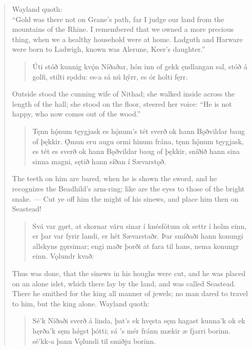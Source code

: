 \begin{verse}
\bvb Wayland quoth: \\
\bvb “Gold was there not on Grane’s path, far I judge our land from the mountains of the Rhine. I remembered that we owned a more precious thing, when we a healthy household were at home. Ladguth and Harware were born to Ladwigh, known was Alerune, Keer’s daughter.”

\begin{verse}
\bva Úti stóð kunnig \hld kvǫ́n Níðaðar,
hón inn of gekk \hld ęndlangan sal,
stóð á golfi, \hld stilti rǫddu:
es-a sá nú hýrr, \hld es ór holti fęrr. \\%
\end{verse}

\bvb Outside stood the cunning wife of Nithad; she walked inside across the length of the hall; she stood on the floor, steered her voice: “He is not happy, who now comes out of the wood.\footnotemark[1]”

\begin{verse}
\bva Tęnn hǫ́num tęygjask \hld es hǫ́num’s tét sverð
ok hann Bǫðvildar \hld baug of þękkir.
Ǫ́mun eru augu \hld ormi hinum frána,
tęnn hǫ́num tęygjask, \hld es tét es sverð
ok hann Bǫðvildar \hld baug of þękkir,
sníðið hann sina \hld sinna magni,
sętið hann síðan \hld í Sævarstǫð. \\%
\end{verse}

\bvb The teeth on him are bared, when he is shown the sword, and he recognizes the Beadhild’s arm-ring; like are the eyes to those of the bright snake. — Cut ye off him the might of his sinews, and place him then on Seastead!

\begin{verse}
\bva Svá var gǫrt, at skornar váru sinar í knésfótum ok settr í holm einn, er þar var fyrir landi, er hét Sævarstaðr. Þar smíðaði hann konungi allskyns gǫrsimar; engi maðr þorði at fara til hans, nema konungr einn. Vǫlundr kvað: \\%
\end{verse}

\bvb Thus was done, that the sinews in his houghs were cut, and he was placed on an alone islet, which there lay by the land, and was called Seastead. There he smithed for the king all manner of jewels; no man dared to travel to him, but the king alone. Wayland quoth: \\

\begin{verse}
\bva Sé’k Níðaði \hld sverð á linda,
þat’s ek hvęsta \hld sęm hagast kunna’k
ok ek hęrða’k \hld sęm hǿgst þótti;
sá ’s mér fránn mækir \hld æ fjarri borinn.
sé’kk-a þann Vǫlundi \hld til smiðju borinn. \\%
\end{verse}


\end{verse}
